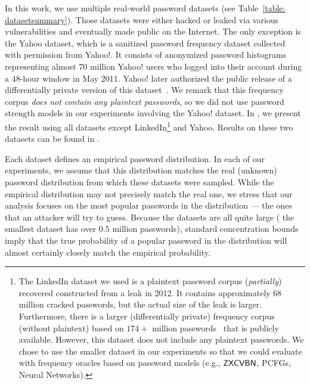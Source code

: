 In this work, we use multiple real-world password datasets (see Table~\ref{table: datasetsummary}). Those datasets were either hacked or leaked via various vulnerabilities and eventually made public on the Internet. The only exception is the Yahoo dataset, which is a sanitized password frequency dataset collected~\cite{SP:Bonneau12}  with permission from Yahoo!. It consists of anonymized password histograms representing almost 70 million Yahoo! users who logged into their account during a $48$-hour window in May 2011. Yahoo! later authorized the public release of a differentially private version of this dataset~\cite{NDSS:BloDatBon16}. We remark that this frequency corpus \textit{does not contain any plaintext passwords}, so we did not use password strength models in our experiments involving the Yahoo! dataset. In , we present the result using all datasets except LinkedIn\footnote{The LinkedIn dataset we used is a plaintext password corpus (\textit{partially}) recovered constructed from a leak in 2012. It contains approximately $68$ million cracked passwords, but the actual size of the leak is larger. Furthermore, there is a larger (differentially private) frequency corpus (without plaintext) based on $174+$ million passwords~\cite{harsha2020bicycle} that is publicly available. However, this dataset does not include any plaintext passwords. We chose to use the smaller dataset in our experiments so that we could evaluate with frequency oracles based on password models (e.g., $\mathsf{ZXCVBN}$, PCFGs, Neural Networks).}  and Yahoo. Results on these two datasets can be found in .

Each dataset defines an empirical password distribution. In each of our experiments, we assume that this distribution matches the real (unknown) password distribution from which these datasets were sampled. While the empirical distribution may not precisely match the real one, we stress that our analysis focuses on the most popular passwords in the distribution --- the ones that an attacker will try to guess. Because the datasets are all quite large ( the smallest dataset has over $0.5$ million passwords), standard concentration bounds imply that the true probability of a popular password in the distribution will almost certainly closely match the empirical probability.






